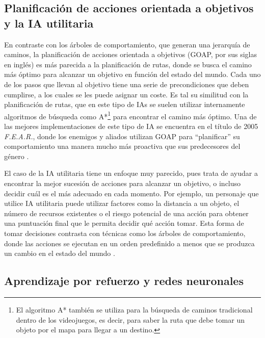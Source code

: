 \subsection{Planificación de acciones orientada a objetivos y la IA utilitaria}

En contraste con los árboles de comportamiento, que generan una jerarquía de caminos, la planificación de acciones orientada a objetivos (GOAP, por sus siglas en inglés) es más parecida a la planificación de rutas, donde se busca el camino más óptimo para alcanzar un objetivo en función del estado del mundo. Cada uno de los pasos que llevan al objetivo tiene una serie de precondiciones que deben cumplirse, a los cuales se les puede asignar un coste. Es tal su similitud con la planificación de rutas, que en este tipo de IAs se suelen utilizar internamente algoritmos de búsqueda como A*\footnote{El algoritmo A* también se utiliza para la búsqueda de caminos tradicional dentro de los videojuegos, es decir, para saber la ruta que debe tomar un objeto por el mapa para llegar a un destino.} para encontrar el camino más óptimo. Una de las mejores implementaciones de este tipo de IA se encuentra en el título de 2005 \textit{F.E.A.R.}, donde los enemigos y aliados utilizan GOAP para ``planificar'' su comportamiento una manera mucho más proactiva que sus predecesores del género \cite{jeff_gdc_2006}.

El caso de la IA utilitaria tiene un enfoque muy parecido, pues trata de ayudar a encontrar la mejor sucesión de acciones para alcanzar un objetivo, o incluso decidir cuál es el más adecuado en cada momento. Por ejemplo, un personaje que utilice IA utilitaria puede utilizar factores como la distancia a un objeto, el número de recursos existentes o el riesgo potencial de una acción para obtener una puntuación final que le permita decidir qué acción tomar. Esta forma de tomar decisiones contrasta con técnicas como los árboles de comportamiento, donde las acciones se ejecutan en un orden predefinido a menos que se produzca un cambio en el estado del mundo \cite{thompson_ai_2024}.

\subsection{Aprendizaje por refuerzo y redes neuronales}

